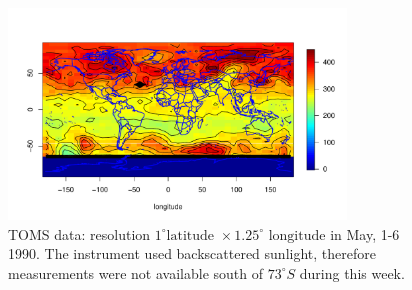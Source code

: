 
\begin{figure}[H]
\label{TOMS_data}
\centering
\includegraphics [width=0.8\textwidth, keepaspectratio]{graphs/TOMS_data.pdf}
\caption{TOMS data: resolution $1^\circ \mbox{latitude } \times 1.25^\circ \mbox{ longitude}$ in May, 1-6 1990. The instrument used backscattered sunlight, therefore measurements were not available south of $73^\circ S$ during this week.}
\end{figure}


